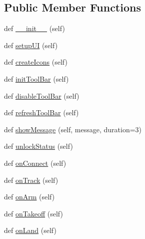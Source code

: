 \subsection*{Public Member Functions}
\begin{DoxyCompactItemize}
\item 
def \mbox{\hyperlink{classwindshape_1_1gui_1_1_user_interface_1_1_user_interface_a6f829e97381911f73d54641581b471e3}{\+\_\+\+\_\+init\+\_\+\+\_\+}} (self)
\item 
def \mbox{\hyperlink{classwindshape_1_1gui_1_1_user_interface_1_1_user_interface_a9dea15485fadb638f05e21898ff642a0}{setup\+UI}} (self)
\item 
def \mbox{\hyperlink{classwindshape_1_1gui_1_1_user_interface_1_1_user_interface_abea610c69bed181cb9f8166e3e8aa5bd}{create\+Icons}} (self)
\item 
def \mbox{\hyperlink{classwindshape_1_1gui_1_1_user_interface_1_1_user_interface_a1d173d3e8dbe52a8774c9049602eebca}{init\+Tool\+Bar}} (self)
\item 
def \mbox{\hyperlink{classwindshape_1_1gui_1_1_user_interface_1_1_user_interface_ad4c1713ba509549d24a75703fbeb6e0c}{disable\+Tool\+Bar}} (self)
\item 
def \mbox{\hyperlink{classwindshape_1_1gui_1_1_user_interface_1_1_user_interface_af47d22413727c6b768772b67fe49fce0}{refresh\+Tool\+Bar}} (self)
\item 
def \mbox{\hyperlink{classwindshape_1_1gui_1_1_user_interface_1_1_user_interface_abec836d949600735c76645000a412826}{show\+Message}} (self, message, duration=3)
\item 
def \mbox{\hyperlink{classwindshape_1_1gui_1_1_user_interface_1_1_user_interface_a50c3bc558203760d9cd4caebb5fdf319}{unlock\+Status}} (self)
\item 
def \mbox{\hyperlink{classwindshape_1_1gui_1_1_user_interface_1_1_user_interface_ab63acb414500fcc98a4ac3447b0f44af}{on\+Connect}} (self)
\item 
def \mbox{\hyperlink{classwindshape_1_1gui_1_1_user_interface_1_1_user_interface_a7507015694cc3304027f777968182ec3}{on\+Track}} (self)
\item 
def \mbox{\hyperlink{classwindshape_1_1gui_1_1_user_interface_1_1_user_interface_aa1efa5b7a6485835efc4f4d7fa846648}{on\+Arm}} (self)
\item 
def \mbox{\hyperlink{classwindshape_1_1gui_1_1_user_interface_1_1_user_interface_a470abbe9bce9b3102124b68e11b46e99}{on\+Takeoff}} (self)
\item 
def \mbox{\hyperlink{classwindshape_1_1gui_1_1_user_interface_1_1_user_interface_a53a63252e00a919480b45dec74cffc5e}{on\+Land}} (self)

\end{DoxyCompactItemize}
